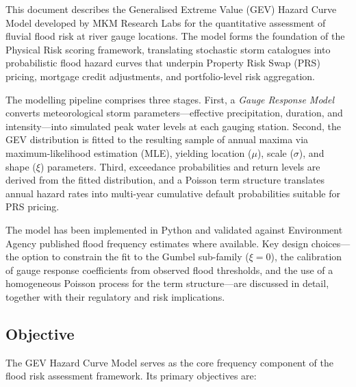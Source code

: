 \documentclass[11pt,a4paper]{article}
\begin{document}
\mkmtitlepage
\mkmlegalpage
\tableofcontents
\clearpage

\mkmexecsummary

This document describes the Generalised Extreme Value (GEV) Hazard Curve Model developed by MKM Research Labs for the quantitative assessment of fluvial flood risk at river gauge locations. The model forms the foundation of the Physical Risk scoring framework, translating stochastic storm catalogues into probabilistic flood hazard curves that underpin Property Risk Swap (PRS) pricing, mortgage credit adjustments, and portfolio-level risk aggregation.

The modelling pipeline comprises three stages. First, a \emph{Gauge Response Model} converts meteorological storm parameters---effective precipitation, duration, and intensity---into simulated peak water levels at each gauging station. Second, the GEV distribution is fitted to the resulting sample of annual maxima via maximum-likelihood estimation (MLE), yielding location ($\mu$), scale ($\sigma$), and shape ($\xi$) parameters. Third, exceedance probabilities and return levels are derived from the fitted distribution, and a Poisson term structure translates annual hazard rates into multi-year cumulative default probabilities suitable for PRS pricing.

The model has been implemented in Python and validated against Environment Agency published flood frequency estimates where available. Key design choices---the option to constrain the fit to the Gumbel sub-family ($\xi = 0$), the calibration of gauge response coefficients from observed flood thresholds, and the use of a homogeneous Poisson process for the term structure---are discussed in detail, together with their regulatory and risk implications.

\clearpage

\mkmpurpose

\subsection{Objective}

The GEV Hazard Curve Model serves as the core frequency component of the flood risk assessment framework. Its primary objectives are:
\end{document}
